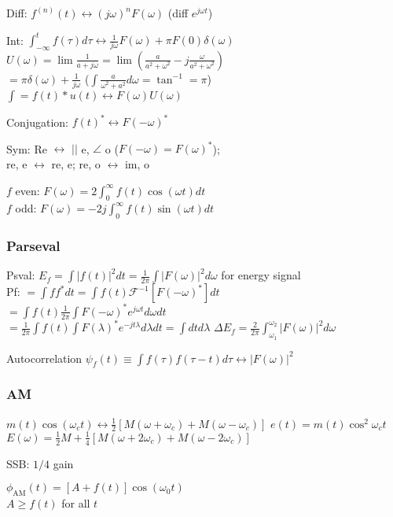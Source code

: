 \documentclass[4pt]{article}
\theoremstyle{definition}
\theoremstyle{definition}
\renewcommand{\o}{\omega}
\newcommand{\lra}{\leftrightarrow}
\begin{document}
\begin{multicols}{3}
    Diff: \(f^{(n)}(t) \lra (j\o)^nF(\o)\) (diff $e^{j\o t}$)    %
    
    Int: \(\int_{-\infty}^t f(\tau)d\tau \lra \frac{1}{j\o}F(\o) + \pi F(0) \delta(\o)\)\\
    \(U(\o) = \lim \frac{1}{a+j\o} = \lim (\frac{a}{a^2+\o^2} - j\frac{\o}{a^2+\o^2}) \) \\
    \(= \pi\delta(\o) + \frac{1}{j\o}\) ($\int \frac{a}{\o^2+a^2}d\o = \tan^{-1}=\pi$)\\
    $\int = f(t) * u(t) \lra F(\o)U(\o)$

    Conjugation: \(f(t)^* \lra F(-\o)^*\)   %

    Sym: Re $\lra$ $||$ e, $\angle$ o ($F(-\o) = F(\o)^*$);\\
    re, e $\lra$ re, e; re, o $\lra$ im, o

    $f$ even: \(F(\o) = 2\int_0^{\infty} f(t)\cos(\o t) dt\)\\
    $f$ odd: \(F(\o) = -2j\int_0^{\infty} f(t) \sin(\o t) dt\)

\subsubsection{Parseval}
    Psval: \(E_f = \int |f(t)|^2 dt = \frac{1}{2\pi} \int |F(\omega)|^2 d\o\)  for energy signal\\  %
    Pf: \(= \int f f^* dt = \int f(t)\mathcal F ^{-1}[F(-\o)^*]dt\)\\
    \(= \int f(t) \frac{1}{2\pi} \int F(-\o)^* e^{j\o t} d\o dt\)\\
    \(= \frac{1}{2\pi}\int f(t) \int F(\lambda)^* e^{-jt\lambda} d\lambda dt = \int dt d\lambda\)
    \(\Delta E_f = \frac{2}{2\pi}\int^{\o_2}_{\o_1} |F(\o)|^2 d\o\) %

    Autocorrelation \(\psi_f(t) \equiv \int f(\tau)f(\tau-t)d\tau \lra |F(\o)|^2\)   %
\subsubsection{AM}
    \(m(t) \cos(\o_c t) \lra \frac{1}{2}[M(\o + \o_c) + M(\o - \o_c)]\)     %
    \(e(t) = m(t)\cos^2 \o_c t\)  \\          %
    \(E(\o) = \frac{1}{2} M + \frac{1}{4}[M(\o + 2\o_c) + M(\o - 2\o_c)]\)

    SSB: $1/4$ gain

    \(\phi_\mathrm{AM} (t) = [A + f(t)] \cos (\omega_0 t)\)\\
    $A \geq f(t)$ for all $t$


\end{multicols}
\end{document}
